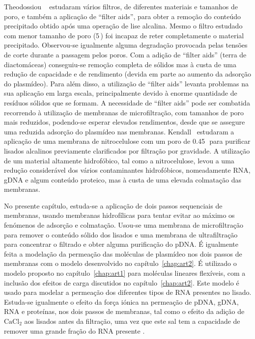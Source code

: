 Theodossiou \et\ \cite{theo} estudaram vários filtros, de diferentes materiais e tamanhos de poro, e também a aplicação de ``filter aids'', para obter a remoção do conteúdo precipitado obtido após uma operação de lise alcalina.
%
Mesmo o filtro estudado com menor tamanho de poro (5\,\micro\meter) foi incapaz de reter completamente o material precipitado. Observou-se igualmente alguma degradação provocada pelas tensões de corte durante a passagem pelos poros. Com a adição de ``filter aids'' (terra de diactomáceas) conseguiu-se remoção completa de sólidos mas à custa de uma redução de capacidade e de rendimento (devida em parte ao aumento da adsorção do plasmídeo).
%
Para além disso, a utilização de ``filter aids'' levanta problemas na sua aplicação em larga escala, principalmente devido à enorme quantidade de resíduos sólidos que se formam.
%
A necessidade de ``filter aids'' pode ser combatida recorrendo à utilização de membranas de microfiltração, com tamanhos de poro mais reduzidos, podendo-se esperar elevados rendimentos, desde que se assegure uma reduzida adsorção do plasmídeo nas membranas.
%
Kendall \et\ estudaram a aplicação de uma membrana de nitrocelulose com um poro de 0.45\,\micro\meter\ para purificar lisados alcalinos previamente clarificados por filtração por gravidade.
%
A utilização de um material altamente hidrofóbico, tal como a nitrocelulose, levou a uma redução considerável dos vários contaminantes hidrofóbicos, nomeadamente RNA, gDNA e algum conteúdo proteico, mas à custa de uma elevada colmatação das membranas.
%
%
%
%
%
%
%

No presente capítulo, estuda-se a aplicação de dois passos sequenciais de membranas, usando membranas hidrofílicas para tentar evitar ao máximo os fenómenos de adsorção e colmatação. Usou-se uma membrana de microfiltração para remover o conteúdo sólido dos lisados e uma membrana de ultrafiltração para concentrar o filtrado e obter alguma purificação do pDNA.
%
%
É igualmente feita a modelação da permeação das moléculas de plasmídeo nos dois passos de membranas com o modelo desenvolvido no capítulo~\ref{chap:art2}. É utilizado o modelo proposto no capítulo~\ref{chap:art1} para moléculas lineares flexíveis, com a inclusão dos efeitos de carga discutidos no capítulo~\ref{chap:art2}. Este modelo é usado para modelar a permeação dos diferentes tipos de RNA presentes no lisado. Estuda-se igualmente o efeito da força iónica na permeação de pDNA, gDNA, RNA e proteínas, nos dois passos de membranas, tal como o efeito da adição de $\mathrm{CaCl_{2}}$ aos lisados antes da filtração, uma vez que este sal tem a capacidade de remover uma grande fração do RNA presente \cite{duvaltff}.

